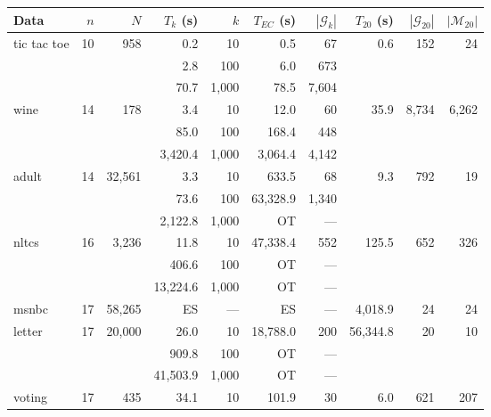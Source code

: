 \documentclass[letterpaper]{article}
\newcommand{\graphset}{\mathcal{G}}
\begin{document}
\begin{table}[!ht]
    \centering
    \small
    \begin{tabular}{lrr||rr||rr||rrr}
        Data & $n$ & $N$ & $T_k$ (s) & $k$ & $T_{EC}$ (s) & $|\graphset_k|$ & $T_{20}$ (s) & $|\graphset_{20}|$ & $|\mathcal{M}_{20}|$\\
        \hline
        \multirow{3}{*}{ tic tac toe } & \multirow{3}{*}{ 10 } & \multirow{3}{*}{ 958 } & 0.2 & 10 & 0.5 & 67 & \multirow{3}{*}{ 0.6 } & \multirow{3}{*}{ 152 } & \multirow{3}{*}{ 24 } \\
& & & 2.8 & 100 & 6.0 & 673 & & & \\
& & & 70.7 & 1,000 & 78.5 & 7,604 & & & \\\hline
\multirow{3}{*}{ wine } & \multirow{3}{*}{ 14 } & \multirow{3}{*}{ 178 } & 3.4 & 10 & 12.0 & 60 & \multirow{3}{*}{ 35.9 } & \multirow{3}{*}{ 8,734 } & \multirow{3}{*}{ 6,262 } \\
& & & 85.0 & 100 & 168.4 & 448 & & & \\
& & & 3,420.4 & 1,000 & 3,064.4 & 4,142 & & & \\\hline
\multirow{3}{*}{ adult } & \multirow{3}{*}{ 14 } & \multirow{3}{*}{ 32,561 } & 3.3 & 10 & 633.5 & 68 & \multirow{3}{*}{ 9.3 } & \multirow{3}{*}{ 792 } & \multirow{3}{*}{ 19 } \\
& & & 73.6 & 100 & 63,328.9 & 1,340 & & & \\
& & & 2,122.8 & 1,000 & \cellcolor{yellow}OT & --- & & & \\\hline
\multirow{3}{*}{ nltcs } & \multirow{3}{*}{ 16 } & \multirow{3}{*}{ 3,236 } & 11.8 & 10 & 47,338.4 & 552 & \multirow{3}{*}{ 125.5 } & \multirow{3}{*}{ 652 } & \multirow{3}{*}{ 326 } \\
& & & 406.6 & 100 & \cellcolor{yellow}OT & --- & & & \\
& & & 13,224.6 & 1,000 & \cellcolor{yellow}OT & --- & & & \\\hline
msnbc & 17 & 58,265 & \cellcolor{yellow}ES & --- & \cellcolor{yellow}ES & --- & 4,018.9 & 24 & 24 \\\hline
\multirow{3}{*}{ letter } & \multirow{3}{*}{ 17 } & \multirow{3}{*}{ 20,000 } & 26.0 & 10 & 18,788.0 & 200 & \multirow{3}{*}{ 56,344.8 } & \multirow{3}{*}{ 20 } & \multirow{3}{*}{ 10 } \\
& & & 909.8 & 100 & \cellcolor{yellow}OT & --- & & & \\
& & & 41,503.9 & 1,000 & \cellcolor{yellow}OT & --- & & & \\\hline
\multirow{3}{*}{ voting } & \multirow{3}{*}{ 17 } & \multirow{3}{*}{ 435 } & 34.1 & 10 & 101.9 & 30 & \multirow{3}{*}{ 6.0 } & \multirow{3}{*}{ 621 } & \multirow{3}{*}{ 207 } \\

\end{tabular}
\end{table}
\end{document}
